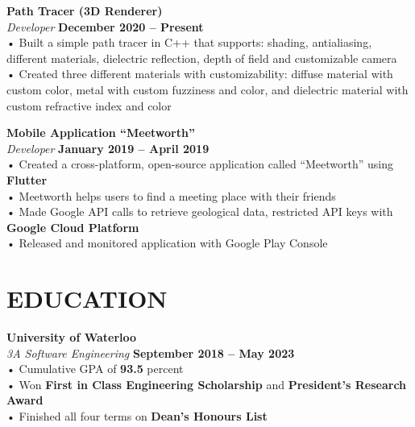 \documentclass[margin,line]{resume}
\begin{document}
\begin{resume}
    \textbf{\listing Path Tracer (3D Renderer)} \vspace{2mm}\\\vspace{1mm}%
    \textsl{Developer} \hfill \textbf{December 2020 -- Present}\\
    • Built a simple path tracer in C++ that supports:
    shading, antialiasing, different materials, dielectric reflection, depth of
    field and customizable camera\\
    • Created three different materials with
    customizability: diffuse material with custom color, metal with custom fuzziness and color, and dielectric material with custom refractive index and color
    \vspace{-1mm}

    \textbf{\listing Mobile Application ``Meetworth''} \vspace{2mm}\\\vspace{1mm}%
    \textsl{Developer} \hfill \textbf{January 2019 -- April 2019}\\
    • Created a cross-platform, open-source application called “Meetworth” using \textbf{Flutter}\\
    • Meetworth helps users to find a meeting place with their friends\\
    • Made Google API calls to retrieve geological data, restricted API keys with \textbf{Google Cloud Platform}\\
    • Released and monitored application with Google Play Console
    \vspace{-1mm}
\sectionline

    \section{\mysidestyle \textbf{\large{E}\small{DUCATION}}}

    \textbf{\listing University of Waterloo} \vspace{2mm}\\\vspace{1mm}%
    \textsl{3A Software Engineering} \hfill \textbf{September 2018 -- May 2023}\\
    • Cumulative GPA of \textbf{93.5} percent\\
    • Won \textbf{First in Class Engineering Scholarship} and 
    \textbf{President’s Research Award}\\
    • Finished all four terms on \textbf{Dean's Honours List}
    \vspace{-1mm}

\end{resume}
\end{document}
